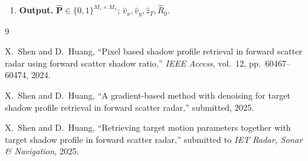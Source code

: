\documentclass[11pt,a4paper]{article}
\begin{document}
\begin{enumerate}
  \item \textbf{Output.}
    $\hat{\mathbf{P}}\in\{0,1\}^{M_z\times M_x}$;\;
    $\hat{v}_x,\hat{v}_y,\hat{z}_T,\hat{R}_0$.
\end{enumerate}

\begin{thebibliography}{9}

X.~Shen and D.~Huang,
``Pixel based shadow profile retrieval in forward scatter radar using
forward scatter shadow ratio,''
\emph{IEEE Access}, vol.~12, pp.~60467--60474, 2024.

X.~Shen and D.~Huang,
``A gradient-based method with denoising for target shadow profile
retrieval in forward scatter radar,''
submitted, 2025.

X.~Shen and D.~Huang,
``Retrieving target motion parameters together with target shadow
profile in forward scatter radar,''
submitted to \emph{IET Radar, Sonar \& Navigation}, 2025.

\end{thebibliography}
\end{document}
